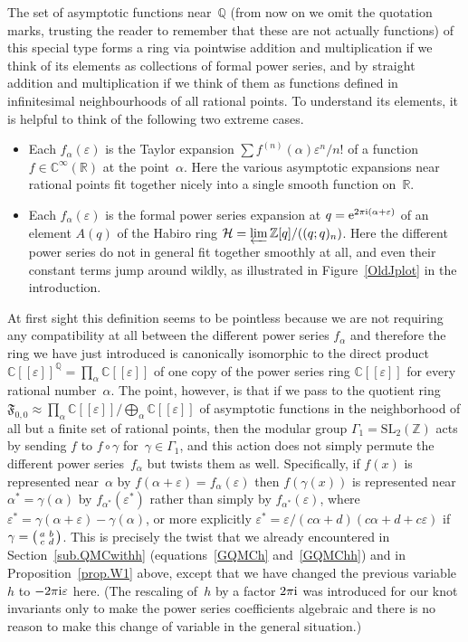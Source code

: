 \documentclass[pdftex]{sigma}
\numberwithin{equation}{section}
\def\calH{\mathcal H}
\def\SL{\mathrm{SL}}
\def\a{\alpha}
\def\R{\mathbb R}
\def\C{\mathbb C}
\def\Z{\mathbb Z}
\def\Q{\mathbb Q}
\def\a{\alpha}
\def\G{\Gamma}
\def\v{\varepsilon}
\def\sma#1#2#3#4{\bigl(\smallmatrix#1&#2\\#3&#4\endsmallmatrix\bigr)} %
\def\G{\Gamma}
\def\ve{\varepsilon}
\def\g{\gamma}
\def\FF{\mathfrak F}
\begin{document}
The set of asymptotic functions near~$\Q$ (from now on we omit the quotation marks,
trusting the reader to remember that these are not actually functions) of this special
type forms a ring via pointwise addition and multiplication if we think of its elements
as collections of formal power series, and by straight addition and multiplication if
we think of them as functions defined in infinitesimal neighbourhoods of all rational
points. To understand its elements, it is helpful to think of the following two
extreme cases.
\begin{itemize}\itemsep=0pt
\item[(i)]
 Each $f_\a(\ve)$ is the Taylor expansion $\sum f^{(n)}(\a) \ve^n/n!$ of a function
 $f\in\C^\infty(\R)$ at the point~$\a$. Here the various asymptotic expansions near
 rational points fit together nicely into a single smooth function on~$\R$.
\item[(ii)]
 Each $f_\a(\ve)$ is the formal power series expansion at $q={\rm e}^{2\pi{\rm i}(\a+\ve)}$ of an
 element $A(q)$ of the Habiro ring $\calH =\varprojlim\Z[q]/((q;q)_n)$. Here the
 different power series do not in general fit together smoothly at all, and even their
 constant terms jump around wildly, as illustrated in Figure~\ref{OldJplot} in the
 introduction.
\end{itemize}

At first sight this definition seems to be pointless because we are not requiring
any compatibility at all between the different power series $f_\a$ and therefore the
ring we have just introduced is canonically isomorphic to the direct product
$\C[[\v]]^\Q=\prod_\a\C[[\v]]$ of one copy of the power series ring $\C[[\v]]$
for every rational number~$\a$. The point, however, is that if we pass to the quotient
ring $\FF_{0,0}\approx\prod_\a\C[[\v]]/\bigoplus_\a\C[[\v]]$ of asymptotic functions
in the neighborhood of all but a finite set of rational points, then the modular
group $\G_1=\SL_2(\Z)$ acts by sending $f$ to $f\circ\g$ for~${\g\in\G_1}$, and this
action does not simply permute the different power series~$f_\a$ but twists them
as well. Specifically, if $f(x)$ is represented near~$\a$ by $f(\a+\v)=f_\a(\v)$
then $f(\g(x))$ is represented near $\a^*=\g(\a)$ by $f_{\a^*}(\ve^*)$ rather than
simply by $f_{\a^*}(\ve)$, where $\ve^*=\g(\a+\ve)-\g(\a)$, or more explicitly
$\v^*=\v/(c\a+d)(c\a+d+c\v)$ if~$\g=\sma abcd$. This is precisely the twist that
we already encountered in Section~\ref{sub.QMCwithh} (equations~\eqref{GQMCh}
and~\eqref{GQMChh}) and in Proposition~\ref{prop.W1} above, except that we have
changed the previous variable~$h$ to $-2\pi {\rm i}\ve$ here. (The rescaling of~$h$ by a
factor $2\pi {\rm i}$ was introduced for our knot invariants only to make the power series
coefficients algebraic and there is no reason to make this change of variable in
the general situation.)
\end{document}
